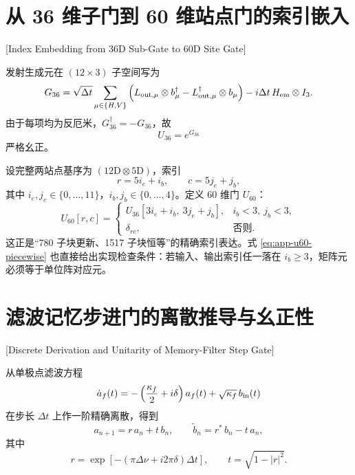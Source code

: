 \section{从 36 维子门到 60 维站点门的索引嵌入}[Index Embedding from 36D Sub-Gate to 60D Site Gate]

发射生成元在 $(12\times 3)$ 子空间写为
\begin{equation}
G_{36}
=
\sqrt{\Delta t}\sum_{\mu\in\{H,V\}}
\left(L_{{\rm out},\mu}\otimes b_\mu^\dagger-L_{{\rm out},\mu}^\dagger\otimes b_\mu\right)
-i\Delta t\,H_{\rm em}\otimes I_3.
\label{eq:app-g36}
\end{equation}
由于每项均为反厄米，$G_{36}^\dagger=-G_{36}$，故
\begin{equation}
U_{36}=e^{G_{36}}
\end{equation}
严格幺正。

设完整两站点基序为 $(12\mathrm{D}\otimes 5\mathrm{D})$，索引
\begin{equation}
r=5i_e+i_b,\qquad c=5j_e+j_b,
\end{equation}
其中 $i_e,j_e\in\{0,\dots,11\}$，$i_b,j_b\in\{0,\dots,4\}$。定义 60 维门 $U_{60}$：
\begin{equation}
U_{60}[r,c]=
\begin{cases}
U_{36}[3i_e+i_b,\ 3j_e+j_b], & i_b<3,\ j_b<3,\\
\delta_{rc}, & \text{否则}.
\end{cases}
\label{eq:app-u60-piecewise}
\end{equation}
这正是“780 子块更新、1517 子块恒等”的精确索引表达。式 \eqref{eq:app-u60-piecewise} 也直接给出实现检查条件：若输入、输出索引任一落在 $i_b\ge 3$，矩阵元必须等于单位阵对应元。

\section{滤波记忆步进门的离散推导与幺正性}[Discrete Derivation and Unitarity of Memory-Filter Step Gate]

从单极点滤波方程
\begin{equation}
\dot a_f(t)= -\left(\frac{\kappa_f}{2}+i\delta\right)a_f(t)+\sqrt{\kappa_f}\,b_{\rm in}(t)
\label{eq:app-filter-ode}
\end{equation}
在步长 $\Delta t$ 上作一阶精确离散，得到
\begin{equation}
a_{n+1}=r\,a_n+t\,b_n,\qquad
\tilde b_n=r^*\,b_n-t\,a_n,
\label{eq:app-filter-discrete}
\end{equation}
其中
\begin{equation}
r=\exp\!\left[-(\pi\Delta\nu+i2\pi\delta)\Delta t\right],\qquad
t=\sqrt{1-|r|^2}.
\label{eq:app-rt}
\end{equation}

